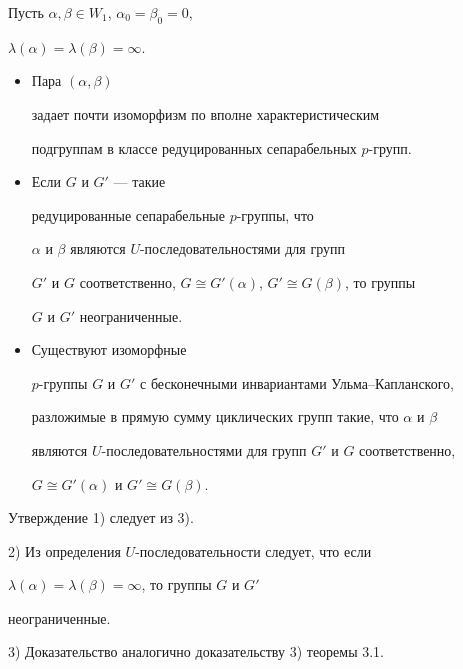 \begin{thms}


Пусть $\alpha,\beta\in W_1$, $\alpha_0=\beta_0=0$,


$\lambda(\alpha)=\lambda(\beta)=\infty$.


\begin{itemize}


\item[1)] Пара $(\alpha,\beta)$


задает почти изоморфизм по вполне характеристическим


подгруппам в классе редуцированных сепарабельных $p$-групп.


\item[2)] Если $G$ и $G'$ --- такие


редуцированные сепарабельные $p$-группы, что


$\alpha$ и $\beta$ являются $U$-последовательностями для групп


$G'$ и $G$ соответственно, $G\cong G'(\alpha)$, $G'\cong G(\beta)$, то группы


$G$ и $G'$ неограниченные.


\item[3)] Существуют изоморфные


$p$-группы $G$ и $G'$ с бесконечными инвариантами Ульма--Капланского,


разложимые в прямую сумму циклических групп такие, что $\alpha$ и $\beta$


являются $U$-последовательностями для групп $G'$ и $G$ соответственно,


$G\cong G'(\alpha)$ и $G'\cong G(\beta)$.


\end{itemize}


\end{thms}





\begin{pf}


Утверждение 1) следует из 3).





2) Из определения $U$-последовательности следует, что если


$\lambda(\alpha)=\lambda(\beta)=\infty$, то группы $G$ и $G'$


неограниченные.





3) Доказательство аналогично доказательству 3) теоремы 3.1.


\end{pf}





